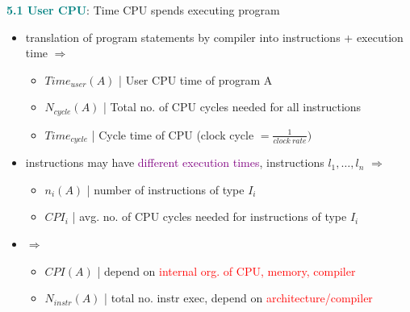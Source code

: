 \documentclass[10pt,landscape]{article}
\begin{document}
\begin{multicols*}{3}
\textbf{\textcolor{teal}{5.1 User CPU}}: Time CPU spends executing program
\begin{itemize}[topsep=0pt,noitemsep,wide=0pt, leftmargin=\dimexpr{} + 2\relax]
    \item translation of program statements by compiler into instructions + execution time
    $\Rightarrow$ \noindent{}
    \begin{itemize}[topsep=0pt,noitemsep,wide=0pt, leftmargin=\dimexpr{} + 2\relax]
        \item $Time_{user}(A)$ | User CPU time of program A
        \item $N_{cycle}(A)$ | Total no. of CPU cycles needed for all instructions
        \item $Time_{cycle}$ | Cycle time of CPU (clock cycle $= \frac{1}{clock \ rate})$
    \end{itemize}
    \item instructions may have \textcolor{purple}{different execution times}, instructions $l_1, \ldots , l_n$ $\Rightarrow$ \noindent{}
    \begin{itemize}[topsep=0pt,noitemsep,wide=0pt, leftmargin=\dimexpr{} + 2\relax]
        \item $n_i(A)$ | number of instructions of type $I_i$
        \item $CPI_i$ | avg. no. of CPU cycles needed for instructions of type $I_i$
    \end{itemize}
    \item $\Rightarrow$ \noindent{}
    \begin{itemize}
        \item $CPI(A)$ | depend on \textcolor{red}{internal org. of CPU, memory, compiler}
        \item $N_{instr}(A)$ | total no. instr exec, depend on \textcolor{red}{architecture/compiler}
    \end{itemize}
\end{itemize}


\end{multicols*}
\end{document}
